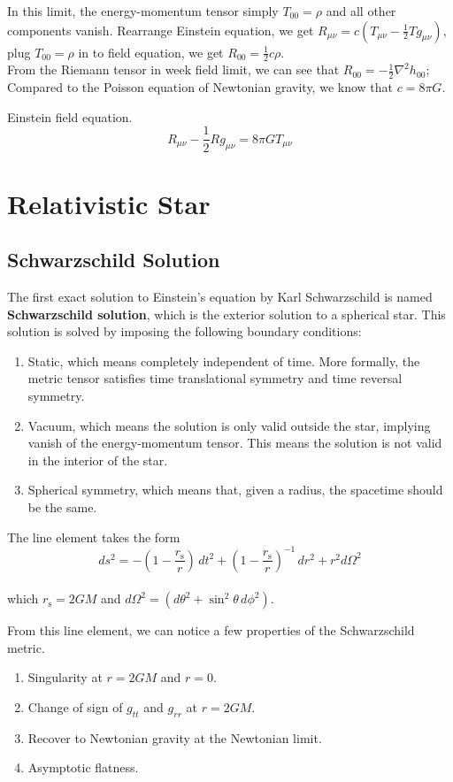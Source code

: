 \documentclass[12pt]{article}
\theoremstyle{mystyle}{\newtheorem{definition}{Definition}[subsection]}
\theoremstyle{mystyle}{\newtheorem{theorem}[definition]{Theorem}}
\theoremstyle{mystyle}{\newtheorem*{remark}{Remark}}
\theoremstyle{mystyle}{\newtheorem{example}{Example}[subsection]}
\theoremstyle{mystyle}{\newtheorem{examples}{Examples}[subsection]}
\theoremstyle{mystyle}{\newtheorem{cthm}{}[subsection]}
\begin{document}
In this limit, the energy-momentum tensor simply \(T_{00} = \rho\) and all other components vanish.
Rearrange Einstein equation, we get \(R_{\mu\nu} = c\left( T_{\mu\nu} - \frac{1}{2}Tg_{\mu\nu} \right)\),
plug \(T_{00} = \rho\) in to field equation, we get \(R_{00}=\frac{1}{2}c\rho\). \\
From the Riemann tensor in week field limit, we can see that \(R_{00}=-\frac{1}{2}\nabla^2 h_{00}\);
Compared to the Poisson equation of Newtonian gravity, we know that \(c = 8\pi G\).
\begin{cthm}
  Einstein field equation.
  \[R_{\mu\nu} -\frac{1}{2}Rg_{\mu\nu} = 8\pi GT_{\mu\nu}\]
\end{cthm}
\newpage
\section{Relativistic Star}

\subsection{Schwarzschild Solution}

The first exact solution to Einstein's equation by Karl Schwarzschild is named \textbf{Schwarzschild solution},
which is the exterior solution to a spherical star.
This solution is solved by imposing the following boundary conditions:

\begin{enumerate}
  \item Static, which means completely independent of time. More formally, the metric tensor satisfies time translational symmetry and time reversal symmetry.
  \item Vacuum, which means the solution is only valid outside the star, implying vanish of the energy-momentum tensor.
        This means the solution is not valid in the interior of the star.
  \item Spherical symmetry, which means that, given a radius, the spacetime should be the same.
\end{enumerate}

\begin{cthm}
  The line element takes the form
  \[ds^2 = -\left(1 - \frac{r_\mathrm{s}}{r} \right)\,dt^2 + \left(1-\frac{r_\mathrm{s}}{r}\right)^{-1} \,dr^2 + r^2 d\Omega^2\]\\
  which \(r_\mathrm{s} = 2GM\) and \(d\Omega^2 = \left(d\theta^2 + \sin^2\theta \, d\phi^2\right)\).
\end{cthm}
From this line element, we can notice a few properties of the Schwarzschild metric.
\begin{enumerate}
  \item Singularity at \(r = 2GM\) and \(r = 0\).
  \item Change of sign of \(g_{tt}\) and \(g_{rr}\) at \(r = 2GM\).
  \item Recover to Newtonian gravity at the Newtonian limit.
  \item Asymptotic flatness.
\end{enumerate}
\end{document}
